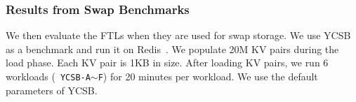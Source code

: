 \subsubsection{Results from Swap Benchmarks}

We then evaluate the FTLs when they are used for
swap storage.  We use YCSB as a benchmark and run it on Redis~\cite{redis}.  We
populate 20M KV pairs during the load phase.  Each KV pair is 1KB in size.
After loading KV pairs, we run 6 workloads (\ie~\texttt{YCSB-A$\sim$F}) for 20 minutes
per workload.  We use the default parameters of YCSB.

